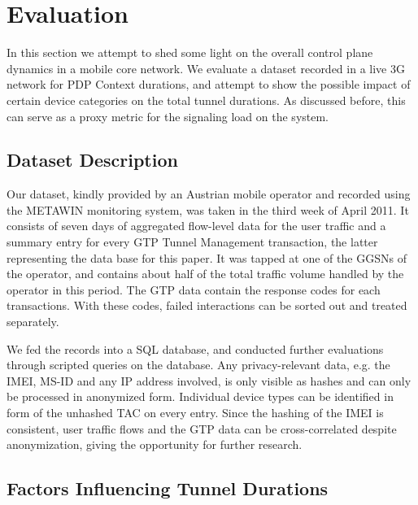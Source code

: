 \section{Evaluation}
\label{sec:evaluations-CONEXT}

In this section we attempt to shed some light on the overall control plane dynamics in a mobile core network. We evaluate a dataset recorded in a live 3G network for PDP Context durations, and attempt to show the possible impact of certain device categories on the total tunnel durations. As discussed before, this can serve as a proxy metric for the signaling load on the system. 


\subsection{Dataset Description}
Our dataset, kindly provided by an Austrian mobile operator and recorded using the \ac{METAWIN} monitoring system, was taken in the third week of April 2011. It consists of seven days of aggregated flow-level data for the user traffic and a summary entry for every \ac{GTP} Tunnel Management transaction, the latter representing the data base for this paper. It was tapped at one of the \acp{GGSN} of the operator, and contains about half of the total traffic volume handled by the operator in this period. The \ac{GTP} data contain the response codes for each transactions. With these codes, failed interactions can be sorted out and treated separately.

We fed the records into a SQL database, and conducted further evaluations through scripted queries on the database. Any privacy-relevant data, e.g. the \ac{IMEI}, \ac{MS-ID} and any IP address involved, is only visible as hashes and can only be processed in anonymized form. Individual device types can be identified in form of the unhashed \ac{TAC} on every entry. Since the hashing of the \ac{IMEI} is consistent, user traffic flows and the \ac{GTP} data can be cross-correlated despite anonymization, giving the opportunity for further research.

 

\subsection{Factors Influencing Tunnel Durations}

